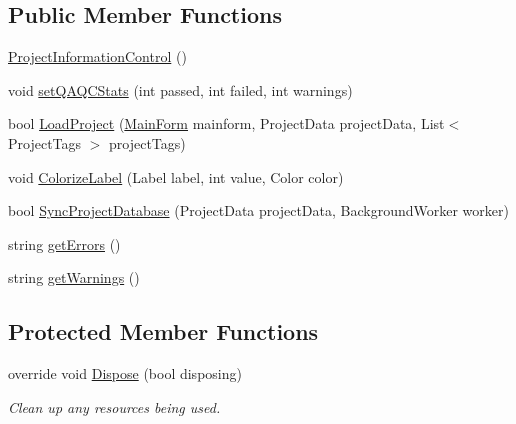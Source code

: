 \subsection*{Public Member Functions}
\begin{DoxyCompactItemize}
\item 
\hyperlink{class_env_int_1_1_win32_1_1_field_tech_1_1_manager_1_1_controls_1_1_project_information_control_a727156078354b065e141f12427479b6f}{Project\+Information\+Control} ()
\item 
void \hyperlink{class_env_int_1_1_win32_1_1_field_tech_1_1_manager_1_1_controls_1_1_project_information_control_acd60f5145dc2f75daefa76ef68c46b1d}{set\+Q\+A\+Q\+C\+Stats} (int passed, int failed, int warnings)
\item 
bool \hyperlink{class_env_int_1_1_win32_1_1_field_tech_1_1_manager_1_1_controls_1_1_project_information_control_a8aea798b6e8479d909c0dbcaf108be6a}{Load\+Project} (\hyperlink{class_env_int_1_1_win32_1_1_field_tech_1_1_manager_1_1_main_form}{Main\+Form} mainform, Project\+Data project\+Data, List$<$ Project\+Tags $>$ project\+Tags)
\item 
void \hyperlink{class_env_int_1_1_win32_1_1_field_tech_1_1_manager_1_1_controls_1_1_project_information_control_a37555e71474a269e4b61b48deb96f39c}{Colorize\+Label} (Label label, int value, Color color)
\item 
bool \hyperlink{class_env_int_1_1_win32_1_1_field_tech_1_1_manager_1_1_controls_1_1_project_information_control_ab92f2fe06c1d3a29e6c53b8f72d725c8}{Sync\+Project\+Database} (Project\+Data project\+Data, Background\+Worker worker)
\item 
string \hyperlink{class_env_int_1_1_win32_1_1_field_tech_1_1_manager_1_1_controls_1_1_project_information_control_a666d678a938d009f2f17ecb4b01e5546}{get\+Errors} ()
\item 
string \hyperlink{class_env_int_1_1_win32_1_1_field_tech_1_1_manager_1_1_controls_1_1_project_information_control_a3fb33a7cfd6d08cf646d3a9383eaf1d7}{get\+Warnings} ()
\end{DoxyCompactItemize}
\subsection*{Protected Member Functions}
\begin{DoxyCompactItemize}
\item 
override void \hyperlink{class_env_int_1_1_win32_1_1_field_tech_1_1_manager_1_1_controls_1_1_project_information_control_a6be93c368f6e9a94af4db78c99c880bd}{Dispose} (bool disposing)
\begin{DoxyCompactList}\small\item\em Clean up any resources being used. \end{DoxyCompactList}\end{DoxyCompactItemize}


